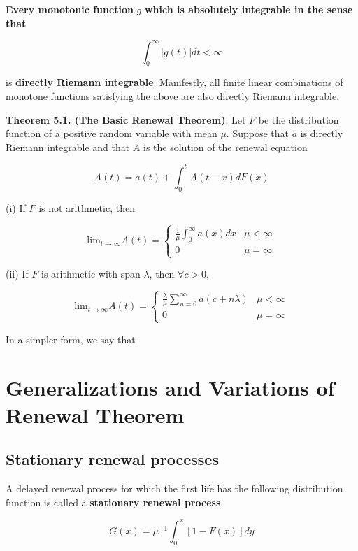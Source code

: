 \documentclass[12pt]{article}
\theoremstyle{nonumberbreak}
\begin{document}
\textbf{Every monotonic function} $g$ \textbf{which is absolutely integrable in the sense that}

$$
\int_0^\infty |g(t)| dt < \infty
$$ 

is \textbf{directly Riemann integrable}. Manifestly, all finite linear combinations of monotone functions satisfying the above are also directly Riemann integrable. 


\begin{theorem}
\textbf{Theorem 5.1. (The Basic Renewal Theorem)}. Let $F$ be the distribution function of a positive random variable with mean $\mu$. Suppose that $a$ is directly Riemann integrable and that $A$ is the solution of the renewal equation

$$
A(t) = a(t) + \int_0^t A(t-x) dF(x)
$$

(i) If $F$ is not arithmetic, then 

$$
\mathrm{lim}_{t\to\infty} A(t) = \begin{cases}
\frac{1}{\mu} \int_0^\infty a(x) dx & \mu < \infty \\
0 & \mu = \infty
\end{cases}
$$

(ii) If $F$ is arithmetic with span $\lambda$, then $\forall c>0$, 

$$
\mathrm{lim}_{t\to\infty} A(t) = \begin{cases}
\frac{\lambda}{\mu} \sum_{n=0}^\infty a(c + n\lambda) & \mu < \infty \\
0 & \mu = \infty
\end{cases}
$$
\end{theorem}

In a simpler form, we say that



\section{Generalizations and Variations of Renewal Theorem}

\subsection{Stationary renewal processes}

A delayed renewal process for which the first life has the following distribution function is called a \textbf{stationary renewal process}. 

$$
G(x) = \mu^{-1} \int_0^x [1 - F(x)] dy
$$
\end{document}
